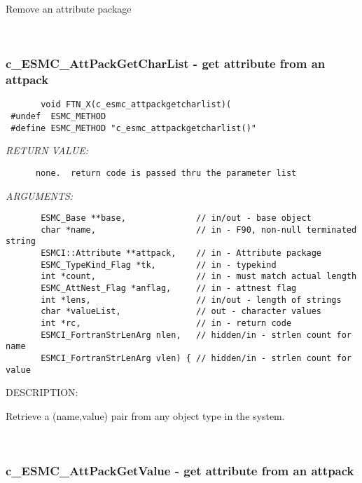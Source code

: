       Remove an attribute package
   
 
\mbox{}\hrulefill\ 
 
\subsubsection [c\_ESMC\_AttPackGetCharList] {c\_ESMC\_AttPackGetCharList - get attribute from an attpack}


  
\begin{verbatim}       void FTN_X(c_esmc_attpackgetcharlist)(
 #undef  ESMC_METHOD
 #define ESMC_METHOD "c_esmc_attpackgetcharlist()"\end{verbatim}{\em RETURN VALUE:}
\begin{verbatim}      none.  return code is passed thru the parameter list
   \end{verbatim}{\em ARGUMENTS:}
\begin{verbatim}       ESMC_Base **base,              // in/out - base object
       char *name,                    // in - F90, non-null terminated string
       ESMCI::Attribute **attpack,    // in - Attribute package
       ESMC_TypeKind_Flag *tk,        // in - typekind
       int *count,                    // in - must match actual length
       ESMC_AttNest_Flag *anflag,     // in - attnest flag
       int *lens,                     // in/out - length of strings
       char *valueList,               // out - character values
       int *rc,                       // in - return code
       ESMCI_FortranStrLenArg nlen,   // hidden/in - strlen count for name
       ESMCI_FortranStrLenArg vlen) { // hidden/in - strlen count for value
   \end{verbatim}
{\sf DESCRIPTION:\\ }


       Retrieve a (name,value) pair from any object type in the system.
   
 
\mbox{}\hrulefill\ 
 
\subsubsection [c\_ESMC\_AttPackGetValue] {c\_ESMC\_AttPackGetValue - get attribute from an attpack}


